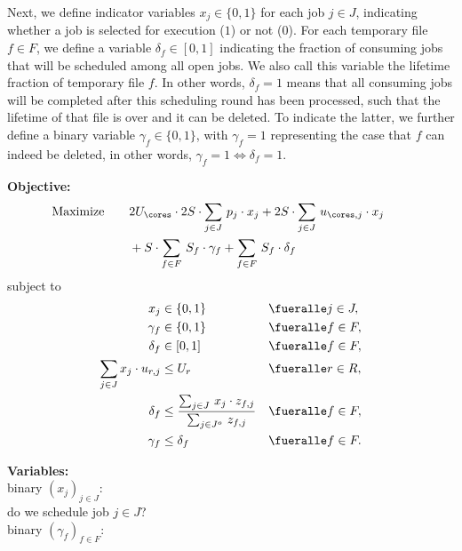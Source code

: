 \documentclass[parskip=half, DIV=18]{scrartcl}
\begin{document}
Next, we define indicator variables $x_j \in \{0,1\}$ for each job $j \in J$, indicating whether a job is selected for execution ($1$) or not ($0$).
For each temporary file $f \in F$, we define a variable $\delta_f \in [0,1]$ indicating the fraction of consuming jobs that will be scheduled among all open jobs.
We also call this variable the lifetime fraction of temporary file $f$.
In other words, $\delta_f = 1$ means that all consuming jobs will be completed after this scheduling round has been processed, such that the lifetime of that file is over and it can be deleted.
To indicate the latter, we further define a binary variable $\gamma_f \in \{0,1\}$, with $\gamma_f = 1$ representing the case that $f$ can indeed be deleted, in other words, $\gamma_f = 1 \Leftrightarrow \delta_f = 1$.


\begin{table}
\begin{minipage}[t]{0.54\textwidth}
\textbf{Objective:}
\begin{align}
\text{Maximize}\qquad
    & 2U_\cores \cdot 2S \cdot \sum_{j \in J}\, p_j \cdot x_j
  +   2S \cdot \sum_{j \in J}\, u_{\cores,j} \cdot x_j \qquad \nonumber \\
&{}+   S \cdot \sum_{f \in F}\, S_f \cdot \gamma_f
  +   \sum_{f \in F}\, S_f \cdot \delta_f  \label{objective}
\end{align}
subject to
\begin{align}
x_j & \in \{0,1\} && \fueralle j \in J, \nonumber \\
\gamma_f & \in \{0,1\} && \fueralle f \in F, \nonumber \\ 
\delta_f & \in [0,1] && \fueralle f \in F, \nonumber \\
\sum_{j \in J} x_j \cdot u_{r,j} &\leq U_r && \fueralle r \in R,
    \label{cn:resources}\\
\delta_f & \leq \frac{\sum_{j \in J}\, x_j \cdot z_{f,j}}{\sum_{j \in J^o}\, z_{f,j}} && \fueralle f \in F,
    \label{cn:lifetmp}\\
\gamma_f &\leq \delta_f && \fueralle f \in F.
    \label{cn:deltmp}
\end{align}
\end{minipage}\qquad
\begin{minipage}[t]{0.44\textwidth}
\textbf{Variables:}\\[1ex]
binary $(x_j)_{j\in J}$: \\
do we schedule job $j\in J$? \\[1ex]
binary $(\gamma_f)_{f\in F}$: \\

\end{minipage}
\end{table}
\end{document}

